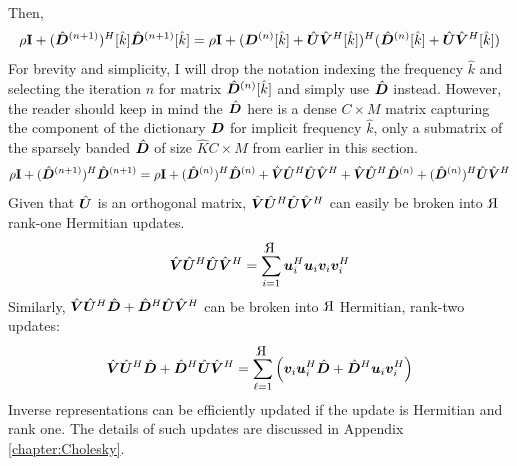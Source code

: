 Then,
%
\begin{equation} \label{equation:Inverse Representation Update}
\rho{\bf I} + (\hat{\bm{D}}^{(n + 1)})^H[\hat{k}]\hat{\bm{D}}^{(n + 1)}[\hat{k}] = \rho{\bf I} + (\bm{D}^{(n)}[\hat{k}] + \hat{\bm{U}}\hat{\bm{V}}^H[\hat{k}])^H(\hat{\bm{D}}^{(n)}[\hat{k}] + \hat{\bm{U}}\hat{\bm{V}}^H[\hat{k}])
\end{equation}
%
For brevity and simplicity, I will drop the notation indexing the frequency $\hat{k}$ and selecting the iteration $n$ for matrix $\hat{\bm{D}}^{(n)}[\hat{k}]$ and simply use $\hat{\bm{D}}$ instead. However, the reader should keep in mind the $\hat{\bm{D}}$ here is a dense $C \times M$ matrix capturing the component of the dictionary $\bm{D}$ for implicit frequency $\hat{k}$, only a submatrix of the sparsely banded $\hat{\bm{D}}$ of size $\hat{K}C \times M$ from earlier in this section.
%
\begin{equation}
\rho{\bf I} + (\hat{\bm{D}}^{(n + 1)})^H\hat{\bm{D}}^{(n + 1)} = \rho{\bf I} + (\hat{\bm{D}}^{(n)})^H\hat{\bm{D}}^{(n)} + \hat{\bm{V}}\hat{\bm{U}}^H \hat{\bm{U}}\hat{\bm{V}}^H + \hat{\bm{V}}\hat{\bm{U}}^H\hat{\bm{D}}^{(n)} + (\hat{\bm{D}}^{(n)})^H\hat{\bm{U}}\hat{\bm{V}}^H
\end{equation}
%
Given that $\hat{\bm{U}}$ is an orthogonal matrix, $\hat{\bm{V}}\hat{\bm{U}}^H\hat{\bm{U}}\hat{\bm{V}}^H$ can easily be broken into $
\reflectbox{R}$ rank-one Hermitian updates.
%
\begin{equation}
\hat{\mV}\hat{\mU}^H\hat{\mU}\hat{\mV}^H = \sum_{i = 1}^{
\reflectbox{R}} \vu_{i}^H\vu_{i}\vv_{i}\vv_{i}^H
\end{equation}
%
Similarly, $\hat{\bm{V}}\hat{\bm{U}}^H\hat{\bm{D}} + \hat{\bm{D}}^H\hat{\bm{U}}\hat{\bm{V}}^H$ can be broken into $
\reflectbox{R}$ Hermitian, rank-two updates:
%
\begin{equation}
\hat{\mV}\hat{\mU}^H\hat{\mD} + \hat{\mD}^H\hat{\mU}\hat{\mV}^H = \sum_{\ell = 1}^{
\reflectbox{R}} \left( \vv_i\vu_i^H\hat{\mD} + \hat{\mD}^H\vu_i\vv_i^H \right)
\end{equation}
%
%
Inverse representations can be efficiently updated if the update is Hermitian and rank one. The details of such updates are discussed in Appendix \ref{chapter:Cholesky}.


